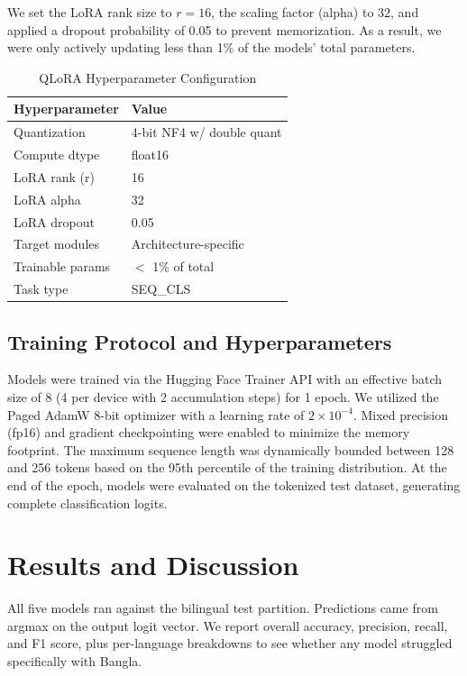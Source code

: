 \documentclass[journal]{IEEEtran}
\begin{document}
We set the LoRA rank size to $r=16$, the scaling factor (alpha) to $32$, and applied a dropout probability of 0.05 to prevent memorization. As a result, we were only actively updating less than 1\% of the models' total parameters.

\begin{table}[htbp]
\caption{QLoRA Hyperparameter Configuration}
\label{tab:qlora}
\centering
\begin{tabular}{ll}
\toprule
\textbf{Hyperparameter} & \textbf{Value} \\
\midrule
Quantization & 4-bit NF4 w/ double quant \\
Compute dtype & float16 \\
LoRA rank (r) & 16 \\
LoRA alpha & 32 \\
LoRA dropout & 0.05 \\
Target modules & Architecture-specific \\
Trainable params & $<$ 1\% of total \\
Task type & SEQ\_CLS \\
\bottomrule
\end{tabular}
\end{table}

\subsection{Training Protocol and Hyperparameters}

Models were trained via the Hugging Face Trainer API with an effective batch size of 8 (4 per device with 2 accumulation steps) for 1 epoch. We utilized the Paged AdamW 8-bit optimizer with a learning rate of $2 \times 10^{-4}$. Mixed precision (fp16) and gradient checkpointing were enabled to minimize the memory footprint. The maximum sequence length was dynamically bounded between 128 and 256 tokens based on the 95th percentile of the training distribution. At the end of the epoch, models were evaluated on the tokenized test dataset, generating complete classification logits.

\section{Results and Discussion}

All five models ran against the bilingual test partition. Predictions came from argmax on the output logit vector. We report overall accuracy, precision, recall, and F1 score, plus per-language breakdowns to see whether any model struggled specifically with Bangla.
\end{document}
